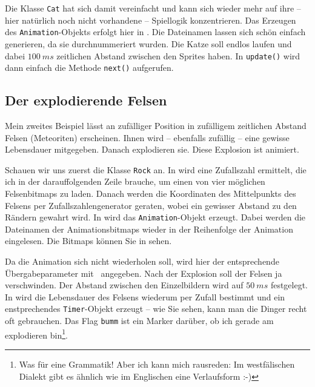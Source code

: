 Die Klasse \texttt{Cat} hat sich damit vereinfacht und kann sich wieder mehr auf ihre -- hier natürlich noch nicht vorhandene -- Spiellogik konzentrieren. Das Erzeugen des \texttt{Animation}-Objekts erfolgt hier in . Die Dateinamen lassen sich schön einfach generieren, da sie durchnummeriert wurden. Die Katze soll endlos laufen und dabei $100~ms$ zeitlichen Abstand zwischen den Sprites haben. In \texttt{update()} wird dann einfach die Methode \texttt{next()} aufgerufen.



\subsection{Der explodierende Felsen}

Mein zweites Beispiel lässt an zufälliger Position in zufälligem zeitlichen Abstand Felsen (Meteoriten) erscheinen. Ihnen wird -- ebenfalls zufällig -- eine gewisse Lebensdauer mitgegeben. Danach explodieren sie. Diese Explosion ist animiert. 

Schauen wir uns zuerst die Klasse \texttt{Rock} an. In  wird eine Zufallszahl ermittelt, die ich in der darauffolgenden Zeile brauche, um einen von vier möglichen Felsenbitmaps zu laden. Danach werden die Koordinaten des Mittelpunkts des Felsens per Zufallszahlengenerator geraten, wobei ein gewisser Abstand zu den Rändern gewahrt wird. In  wird das \texttt{Animation}-Objekt erzeugt. Dabei werden die Dateinamen der Animationsbitmaps wieder in der Reihenfolge der Animation eingelesen. Die Bitmaps können Sie in  sehen. 

Da die Animation sich nicht wiederholen soll, wird hier der entsprechende Übergabeparameter mit \false\ angegeben. Nach der Explosion soll der Felsen ja verschwinden. Der Abstand zwischen den Einzelbildern wird auf $50~ms$ festgelegt. In  wird die Lebensdauer des Felsens wiederum per Zufall bestimmt und ein enstprechendes \texttt{Timer}-Objekt erzeugt -- wie Sie sehen, kann man die Dinger recht oft gebrauchen. Das Flag \texttt{bumm} ist ein Marker darüber, ob ich gerade am explodieren bin\footnote{Was für eine Grammatik! Aber ich kann mich rausreden: Im westfälischen Dialekt gibt es ähnlich wie im Englischen eine Verlaufsform :-)}. 

